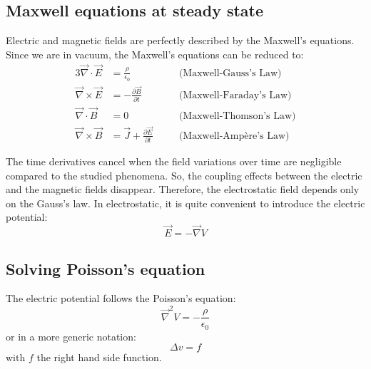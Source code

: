\begin{refsection}

  \subsection{Maxwell equations at steady state}
  \label{chap3:sec:maxwell}
  Electric and magnetic fields are perfectly described by the Maxwell's equations. Since we are in vacuum, the Maxwell's equations can be reduced to:
  \begin{alignat*}{3}
    \overrightarrow{\nabla} \cdot \overrightarrow{E}  & = \frac{\rho}{\epsilon_{0}}\quad                                           &  & \text{(Maxwell-Gauss's Law)}   \\
    \overrightarrow{\nabla} \times \overrightarrow{E} & = - \frac{\partial \overrightarrow{B}}{\partial t}\quad                    &  & \text{(Maxwell-Faraday's Law)} \\
    \overrightarrow{\nabla} \cdot \overrightarrow{B}  & = 0\quad                                                                   &  & \text{(Maxwell-Thomson's Law)} \\
    \overrightarrow{\nabla} \times \overrightarrow{B} & = \overrightarrow{J} + \frac{\partial \overrightarrow{E}}{\partial t}\quad &  & \text{(Maxwell-Ampère's Law)}
  \end{alignat*}

  The time derivatives cancel when the field variations over time are negligible compared to the studied phenomena. So, the coupling effects between the electric and the magnetic fields disappear. Therefore, the electrostatic field depends only on the Gauss’s law. In electrostatic, it is quite convenient to introduce the electric potential:
  \begin{equation}
    \vec{E} = - \vec{\nabla}V
  \end{equation}

  \subsection{Solving Poisson's equation}
  The electric potential follows the Poisson's equation:
  \begin{equation}
    \vec{\nabla}^{2}V = -\frac{\rho}{\epsilon_{0}}
  \end{equation}
  or in a more generic notation:
  \begin{equation}
    \Delta v = f
  \end{equation}
  with $f$ the right hand side function.


\end{refsection}
